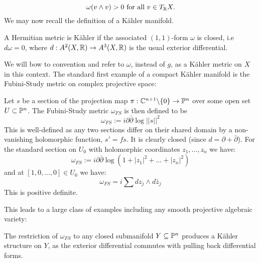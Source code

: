 \[
\omega( v \wedge v)  > 0 \text{ for all } v \in T_{\mathbb{R}} X.
\]
We may now recall the definition of a K\"ahler manifold.
\begin{definition}
A Hermitian metric is K\"ahler if the associated \((1,1)\)-form \(\omega\) is closed, i.e \(d \omega = 0\), where \(d: A^2(X,\mathbb{R}) \to A^3(X,\mathbb{R})\) is the usual exterior differential.
\end{definition}
We will bow to convention and refer to \(\omega\), instead of \(g\), as a K\"ahler metric on \(X\) in this context. The standard first example of a compact K\"ahler manifold is the Fubini-Study metric on complex projective space:
\begin{example}
Let \(s\) be a section of the projection map \(\pi: \mathbb{C}^{n+1} \backslash \{0\} \to \mathbb{P}^n\) over some open set \(U \subset \mathbb{P}^n\). The Fubini-Study metric \(\omega_{FS}\) is then defined to be
\[
\omega_{FS} := i \partial \bar{\partial} \log  ||s||^2
\]
This is well-defined as any two sections differ on their shared domain by a non-vanishing holomorphic function, \(s' = fs\). It is clearly closed (since \(d = \partial + \bar{\partial}\)). For the standard section on \(U_0\) with holomorphic coordinates \(z_1,\dots,z_n\) we have:
\[
\omega_{FS} := i \partial \bar{\partial} \log ( 1 + |z_1|^2 + \dots + |z_n|^2)
\]
and at \([1,0,\dots,0] \in U_0\) we have:
\[
\omega_{FS} = i \sum dz_j \wedge d \bar{z}_j
\]
This is positive definite.
\end{example}
This leads to a large class of examples including any smooth projective algebraic variety:
\begin{example}
The restriction of \(\omega_{FS}\) to any closed submanifold \(Y \subseteq \mathbb{P}^n\) produces a K\"ahler structure on \(Y\), as the exterior differential commutes with pulling back differential forms.
\end{example}
